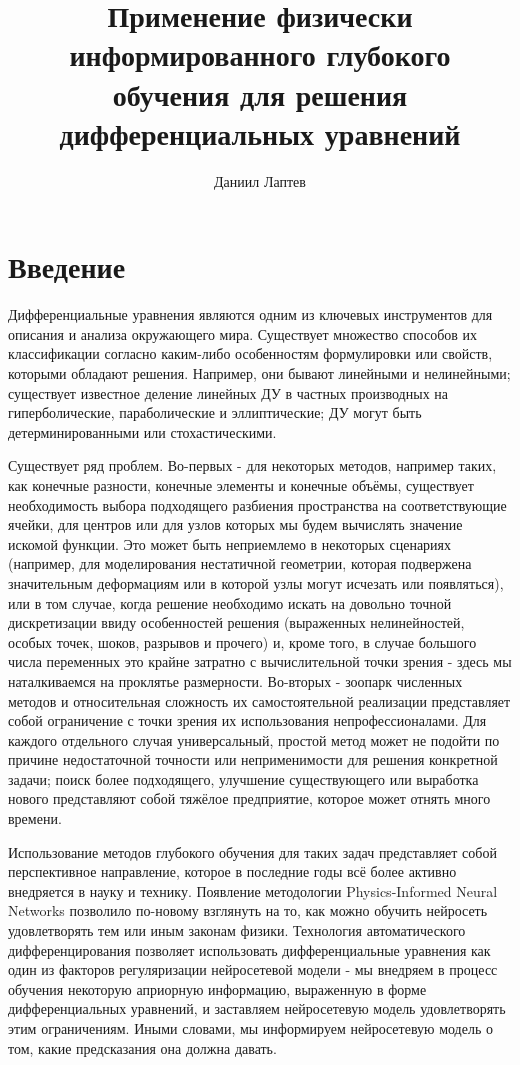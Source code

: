 \documentclass[a4paper, 12pt]{article}
\title{Применение физически информированного глубокого обучения для решения дифференциальных уравнений}
\author{Даниил Лаптев}
\begin{document}
\maketitle
\tableofcontents

\newpage
\section*{Введение}

Дифференциальные уравнения являются одним из ключевых инструментов для описания и анализа окружающего мира. Существует множество способов их классификации согласно каким-либо особенностям формулировки или свойств, которыми обладают решения. Например, они бывают линейными и нелинейными; существует известное деление линейных ДУ в частных производных на гиперболические, параболические и эллиптические; ДУ могут быть детерминированными или стохастическими.

Существует ряд проблем. Во-первых - для некоторых методов, например таких, как конечные разности, конечные элементы и конечные объёмы, существует необходимость выбора подходящего разбиения пространства на соответствующие ячейки, для центров или для узлов которых мы будем вычислять значение искомой функции. Это может быть неприемлемо в некоторых сценариях (например, для моделирования нестатичной геометрии, которая подвержена значительным деформациям или в которой узлы могут исчезать или появляться), или в том случае, когда решение необходимо искать на довольно точной дискретизации ввиду особенностей решения (выраженных нелинейностей, особых точек, шоков, разрывов и прочего) и, кроме того, в случае большого числа переменных это крайне затратно с вычислительной точки зрения - здесь мы наталкиваемся на проклятье размерности. Во-вторых - зоопарк численных методов и относительная сложность их самостоятельной реализации представляет собой ограничение с точки зрения их использования непрофессионалами. Для каждого отдельного случая универсальный, простой метод может не подойти по причине недостаточной точности или неприменимости для решения конкретной задачи; поиск более подходящего, улучшение существующего или выработка нового представляют собой тяжёлое предприятие, которое может отнять много времени.

Использование методов глубокого обучения для таких задач представляет собой перспективное направление, которое в последние годы всё более активно внедряется в науку и технику. Появление методологии Physics-Informed Neural Networks \cite{RAISSI2019686} позволило по-новому взглянуть на то, как можно обучить нейросеть удовлетворять тем или иным законам физики. Технология автоматического дифференцирования позволяет использовать дифференциальные уравнения как один из факторов регуляризации нейросетевой модели - мы внедряем в процесс обучения некоторую априорную информацию, выраженную в форме дифференциальных уравнений, и заставляем нейросетевую модель удовлетворять этим ограничениям. Иными словами, мы информируем нейросетевую модель о том, какие предсказания она должна давать.
\end{document}
